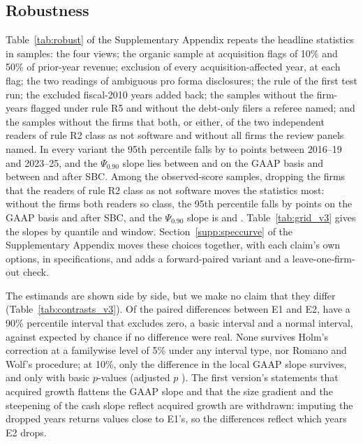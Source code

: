 \subsection{Robustness}\label{sec:empirics-robust}
Table~\ref{tab:robust} of the Supplementary Appendix repeats the headline statistics in \NVariants{} samples: the four views; the organic sample at acquisition flags of 10\% and 50\% of prior-year revenue; exclusion of every acquisition-affected year, at each flag; the two readings of ambiguous pro forma disclosures; the rule of the first test run; the excluded fiscal-2010 years added back; the samples without the firm-years flagged under rule R5 and without the debt-only filers a referee named; and the samples without the firms that both, or either, of the two independent readers of rule R2 class as not software and without all firms the review panels named. In every variant the 95th percentile falls by \TopFallAllLo{} to \TopFallAllHi{} points between 2016--19 and 2023--25, and the $\Psi_{0.90}$ slope lies between \PsiVarOpLo{} and \PsiVarOpHi{} on the GAAP basis and between \PsiVarCashLo{} and \PsiVarCashHi{} after SBC. Among the observed-score samples, dropping the firms that the readers of rule R2 class as not software moves the statistics most: without the firms both readers so class, the 95th percentile falls by \VRtwoBothFallOp{} points on the GAAP basis and \VRtwoBothFallCash{} after SBC, and the $\Psi_{0.90}$ slope is \VRtwoBothPsiOp{} and \VRtwoBothPsiCash. Table~\ref{tab:grid_v3} gives the slopes by quantile and window. Section~\ref{supp:speccurve} of the Supplementary Appendix moves these choices together, with each claim's own options, in \ScNSpecs{} specifications, and adds a forward-paired variant and a leave-one-firm-out check.

The estimands are shown side by side, but we make no claim that they differ (Table~\ref{tab:contrasts_v3}). Of the \ContrN{} paired differences between E1 and E2, \ContrExclPct{} have a 90\% percentile interval that excludes zero, \ContrExclBasic{} a basic interval and \ContrExclNormal{} a normal interval, against \ContrExpected{} expected by chance if no difference were real. None survives Holm's correction at a familywise level of 5\% under any interval type, nor Romano and Wolf's procedure; at 10\%, only the difference in the local GAAP slope survives, and only with basic $p$-values (adjusted $p$ \ContrLocalOpHolm). The first version's statements that acquired growth flattens the GAAP slope and that the size gradient and the steepening of the cash slope reflect acquired growth are withdrawn: imputing the dropped years returns values close to E1's, so the differences reflect which years E2 drops.

